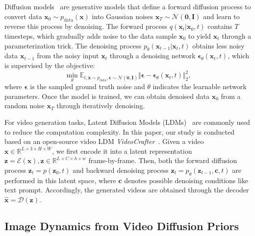 Diffusion models~\citep{ho2020denoising,sohldickstein2015deep} are generative models that define a forward diffusion process to convert data $\mathbf{x}_0 \sim p_{\text{data}}(\mathbf{x})$ into Gaussian noises $\mathbf{x}_T \sim \mathcal{N}(\mathbf{0}, \mathbf{I})$ and learn to reverse this process by denoising. The forward process $q(\mathbf{x}_t|\mathbf{x}_0,t)$ contains $T$ timesteps, which gradually adds noise to the data sample $\mathbf{x}_0$ to yield $\mathbf{x}_t$ through a parameterization trick. The denoising process $p_{\theta}(\mathbf{x}_{t-1}|\mathbf{x}_t,t)$ obtains less noisy data $\boldsymbol{x}_{t-1}$ from the noisy input $\boldsymbol{x}_t$ through a denoising network $\mathbf{\epsilon}_{\theta}\left(\mathbf{x}_t, t\right)$, which is supervised by the objective:
\begin{equation}
\min _{\theta} \mathbb{E}_{t, \mathbf{x} \sim p_{\text{data}}, \mathbf{\epsilon} \sim \mathcal{N}(\mathbf{0}, \mathbf{I})}\Vert\mathbf{\epsilon}-\mathbf{\epsilon}_{\theta}\left(\mathbf{x}_t, t\right)\Vert_2^2,
\end{equation} 
where $\mathbf{\epsilon}$ is the sampled ground truth noise and $\theta$ indicates the learnable network parameters. Once the model is trained, we can obtain denoised data $\mathbf{x}_0$ from a random noise $\mathbf{x}_T$ through iteratively denoising.

For video generation tasks, Latent Diffusion Models (LDMs)~\cite{ho2022imagenvideo} are commonly used to reduce the computation complexity. In this paper, our study is conducted based on an open-source video LDM \textit{VideoCrafter}~\cite{chen2023videocrafter1}. Given a video $\mathbf{x} \in \mathbb{R}^{L\times 3\times H\times W}$, we first encode it into a latent representation $\mathbf{z}=\mathcal{E}(\mathbf{x}), \mathbf{z} \in \mathbb{R}^{L\times C\times h\times w}$ frame-by-frame. Then, both the forward diffusion process $\mathbf{z}_t=p(\mathbf{z}_0, t)$ and backward denoising process $\mathbf{z}_t=p_{\theta}(\mathbf{z}_{t-1}, \mathbf{c}, t)$ are performed in this latent space, where $\mathbf{c}$ denotes possible denoising conditions like text prompt. Accordingly, the generated videos are obtained through the decoder $\hat{\mathbf{x}}=\mathcal{D}(\mathbf{z})$.


\subsection{Image Dynamics from Video Diffusion Priors}
\label{subsec:alignment}


